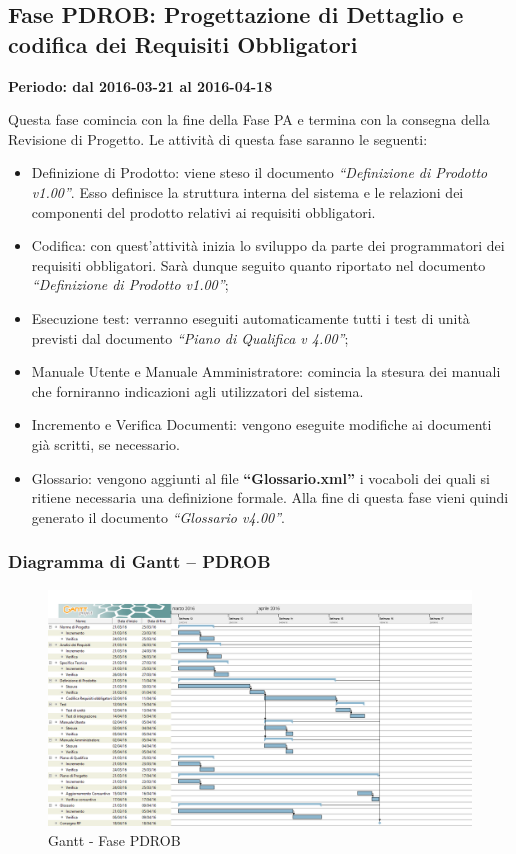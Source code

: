 \documentclass[../PianoProgetto.tex]{subfiles}
\begin{document}
	\subsection{Fase PDROB: Progettazione di Dettaglio e codifica dei Requisiti Obbligatori}
		\textbf{Periodo: dal 2016-03-21 al 2016-04-18}
		
		Questa fase comincia con la fine della Fase PA e termina con la consegna della Revisione di Progetto. Le attività di questa fase saranno le seguenti:
		\begin{itemize}
			\item Definizione di Prodotto: viene steso il documento \textit{“Definizione di Prodotto v1.00”}. Esso definisce la struttura interna del sistema e le relazioni dei componenti del prodotto relativi ai requisiti obbligatori.

			\item Codifica: con quest’attività inizia lo sviluppo da parte dei programmatori dei requisiti obbligatori. Sarà dunque seguito quanto riportato nel documento \textit{“Definizione di Prodotto v1.00”};

			\item Esecuzione test: verranno eseguiti automaticamente tutti i test di unità previsti dal documento \textit{“Piano di Qualifica v 4.00”};

			\item Manuale Utente e Manuale Amministratore: comincia la stesura dei manuali che forniranno indicazioni agli utilizzatori del sistema.

			\item Incremento e Verifica Documenti: vengono eseguite modifiche ai documenti già scritti, se necessario.

			\item Glossario: vengono aggiunti al file \textbf{“Glossario.xml”} i vocaboli dei quali si ritiene necessaria una definizione formale. Alla fine di questa fase vieni quindi generato il documento \textit{“Glossario v4.00”}.
		\end{itemize}

		\subsubsection{Diagramma di Gantt – PDROB}
			\begin{figure}[!h]
				\centering
				\includegraphics[width=\textwidth]{gantt_png/4-requisiti_obbligatori}
				\caption{Gantt - Fase PDROB}
				\label{fig:Gantt - Fase PDROB}
			\end{figure}
			
\end{document}

